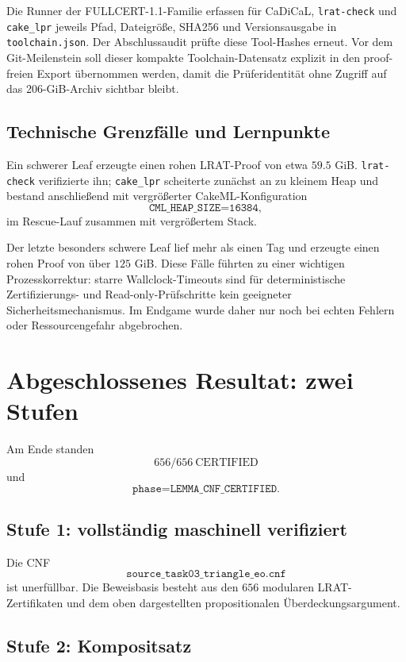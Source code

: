 \documentclass[11pt,a4paper]{article}
\newcommand{\code}[1]{\texttt{#1}}
\begin{document}
Die Runner der FULLCERT-1.1-Familie erfassen für CaDiCaL, \code{lrat-check} und \code{cake\_lpr} jeweils Pfad, Dateigröße, SHA256 und Versionsausgabe in \code{toolchain.json}. Der Abschlussaudit prüfte diese Tool-Hashes erneut. Vor dem Git-Meilenstein soll dieser kompakte Toolchain-Datensatz explizit in den proof-freien Export übernommen werden, damit die Prüferidentität ohne Zugriff auf das 206-GiB-Archiv sichtbar bleibt.

\subsection{Technische Grenzfälle und Lernpunkte}

Ein schwerer Leaf erzeugte einen rohen LRAT-Proof von etwa $59.5$ GiB. \code{lrat-check} verifizierte ihn; \code{cake\_lpr} scheiterte zunächst an zu kleinem Heap und bestand anschließend mit vergrößerter CakeML-Konfiguration
\[
\code{CML\_HEAP\_SIZE=16384},
\]
im Rescue-Lauf zusammen mit vergrößertem Stack.

Der letzte besonders schwere Leaf lief mehr als einen Tag und erzeugte einen rohen Proof von über $125$ GiB. Diese Fälle führten zu einer wichtigen Prozesskorrektur: starre Wallclock-Timeouts sind für deterministische Zertifizierungs- und Read-only-Prüfschritte kein geeigneter Sicherheitsmechanismus. Im Endgame wurde daher nur noch bei echten Fehlern oder Ressourcengefahr abgebrochen.

\section{Abgeschlossenes Resultat: zwei Stufen}

Am Ende standen
\[
\boxed{656/656\ \text{CERTIFIED}}
\]
und
\[
\code{phase=LEMMA\_CNF\_CERTIFIED}.
\]

\subsection*{Stufe 1: vollständig maschinell verifiziert}

Die CNF
\[
\boxed{\code{source\_task03\_triangle\_eo.cnf}}
\]
ist unerfüllbar. Die Beweisbasis besteht aus den $656$ modularen LRAT-Zertifikaten und dem oben dargestellten propositionalen Überdeckungsargument.

\subsection*{Stufe 2: Kompositsatz}
\end{document}
